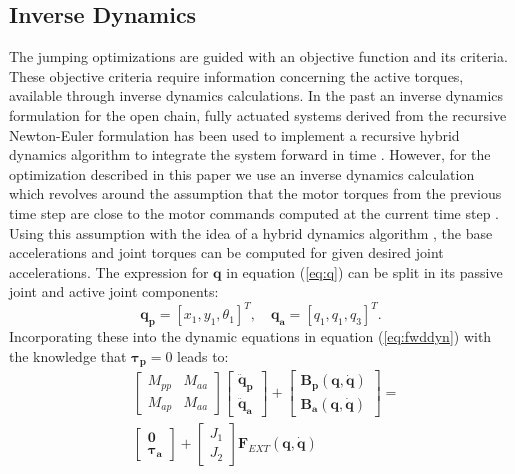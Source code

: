 \documentclass[letterpaper, 10 pt, conference]{ieeeconf}  %
\begin{document}
\subsection{Inverse Dynamics}
The jumping optimizations are guided with an objective function and its criteria. These objective criteria require information concerning the active torques, available through inverse dynamics calculations. In the past an inverse dynamics formulation for the open chain, fully actuated systems derived from the recursive Newton-Euler formulation has been used to implement a recursive hybrid dynamics algorithm to integrate the system forward in time \cite{wang1999weight} \cite{albro2000computation} \cite{albro2001optimal}. However, for the optimization described in this paper we use an inverse dynamics calculation which revolves around the assumption that the motor torques from the previous time step are close to the motor commands computed at the current
time step \cite{nakanishi2007inverse}. Using this assumption with the idea of a hybrid dynamics algorithm \cite{featherstone1984robot}, the base accelerations and joint torques can be computed for given desired joint accelerations. The expression for $\mathbf{q}$ in equation (\ref{eq:q}) can be split in its passive joint and active joint components:
 \begin{equation}
\mathbf{q_p} = [x_1,y_1,\theta_1]^T, \quad  
\mathbf{q_a} = [q_1,q_1,q_3]^T.
\end{equation}
\noindent
Incorporating these into the dynamic equations in equation (\ref{eq:fwddyn}) with the knowledge that $\boldsymbol{\tau_p}=0$ leads to:
\begin{equation}
\begin{aligned}
&\left[\begin{array}{cc}  
M_{pp} & M_{aa}\\
M_{ap} & M_{aa}
\end{array} \right]
\left[\begin{array}{c}  
\mathbf{\ddot q_p}\\
\mathbf{\ddot q_a}
\end{array} \right] +
\left[\begin{array}{c}  
\mathbf{B_p (q,\dot q)}\\
\mathbf{B_a (q,\dot q)}
\end{array} \right] 
=\\
&\left[\begin{array}{c}  
\mathbf{0}\\
\boldsymbol{\tau_a}
\end{array} \right] 
+
\left[\begin{array}{c}  
J_1\\
J_2
\end{array} \right] 
\mathbf{F}_{EXT}\mathbf{(q, \dot q)}
\end{aligned}
\end{equation}		
\end{document}
